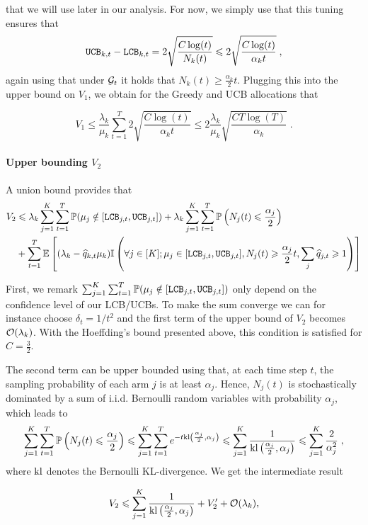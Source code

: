 that we will use later in our analysis. For now, we simply use that this tuning ensures that \[\texttt{UCB}_{k,t}-\texttt{LCB}_{k, t} = 2\sqrt{\frac{C\log(t)}{N_k(t)}} \leqslant 2\sqrt{\frac{C\log(t)}{\alpha_k t}} \;, \]
again using that under $\mathcal{G}_t$ it holds that $N_k(t)\geq \frac{\alpha_k}{2}t$. Plugging this into the upper bound on $V_1$, we obtain for the Greedy and UCB allocations that 

\[V_1 \leq \frac{\lambda_k}{\mu_k} \sum_{t=1}^T 2 \sqrt{\frac{C\log(t)}{\alpha_k t}} \leq 2\frac{\lambda_k}{\mu_k}\sqrt{\frac{CT\log(T)}{\alpha_k}}\;. \] 


\paragraph{Upper bounding $V_2$} A union bound provides that 
\begin{align*}
V_2 & \leqslant \lambda_k \sum_{j=1}^K \sum_{t=1}^T \mathbb{P}(\mu_j \notin [\texttt{LCB}_{j, t}, \texttt{UCB}_{j, t}])  + \lambda_k \sum_{j=1}^K \sum_{t=1}^T\mathbb{P}\left(N_j(t)\leqslant \frac{\alpha_j}{2}\right) \\
&+ \sum_{t=1}^T \mathbb{E}\left[(\lambda_k - \widehat{q}_{k,t}\mu_k)\mathbb{I}\left(\forall j \in [K]; \mu_j \in [\texttt{LCB}_{j, t}, \texttt{UCB}_{j, t}], N_j(t)\geqslant \frac{\alpha_j}{2}t,  \sum_j \widehat{q}_{j,t} \geqslant 1\right)\right] 
\end{align*}
 
First, we remark $\sum_{j=1}^K \sum_{t=1}^T \mathbb{P}(\mu_j \notin [\texttt{LCB}_{j, t}, \texttt{UCB}_{j, t}])$ only depend on the confidence level of our LCB/UCBs. To make the sum converge we can for instance choose $\delta_t = 1/t^2$ and the first term of the upper bound of $V_2$ becomes $\mathcal{O}(\lambda_k)$. With the Hoeffding's bound presented above, this condition is satisfied for $C=\frac{3}{2}$.

The second term can be upper bounded using that, at each time step $t$, the sampling probability of each arm $j$ is at least $\alpha_j$. Hence, $N_j(t)$ is stochastically dominated by a sum of i.i.d. Bernoulli random variables with probability $\alpha_j$, which leads to 
\begin{align*}
\sum_{j=1}^K \sum_{t=1}^T\mathbb{P}\left(N_j(t)\leqslant \frac{\alpha_j}{2}\right) \leqslant \sum_{j=1}^K \sum_{t=1}^T e^{-t \text{\normalfont kl}\left(\frac{\alpha_j}{2}, \alpha_j\right)} \leqslant  \sum_{j=1}^K   \frac{1}{\text{\normalfont kl}\left(\frac{\alpha_j}{2}, \alpha_j\right)} \leqslant \sum_{j=1}^K\frac{2}{\alpha_j^2}\;,
\end{align*}
where $\text{\normalfont kl}$ denotes the Bernoulli KL-divergence. We get the intermediate result 

\[V_2 \leqslant \sum_{j=1}^K   \frac{1}{\text{\normalfont kl}\left(\frac{\alpha_j}{2}, \alpha_j\right)} + V_2'+ \mathcal{O}(\lambda_k),  \]

